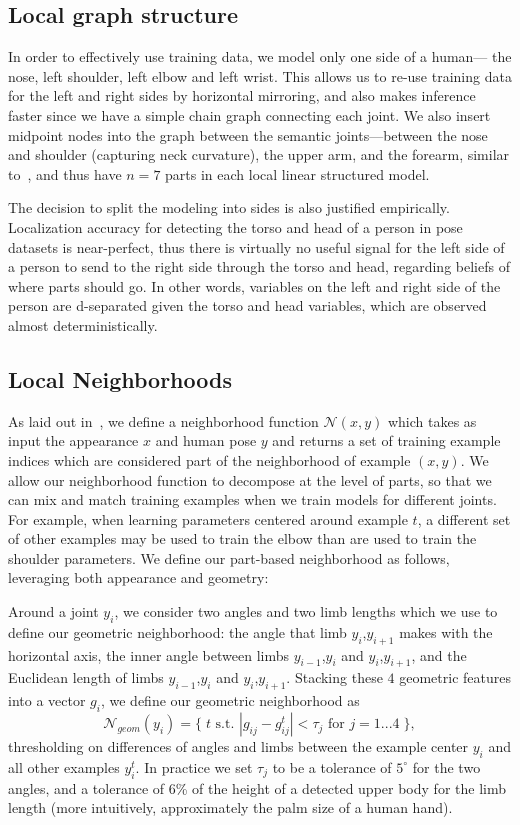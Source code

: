 \subsection{Local graph structure}
In order to effectively use training data, we model only one side of a human--- 
the nose, left shoulder, left elbow and left wrist. This allows us to re-use 
training data for the left and right sides by horizontal mirroring, and also 
makes inference faster since we have a simple chain graph connecting each 
joint.  We also insert midpoint nodes into the graph between the semantic 
joints---between the nose and shoulder  (capturing neck curvature), the upper 
arm, and the forearm, similar to~\citet{deva2011}, and thus have $n=7$ parts in 
each local linear structured model.

The decision to split the modeling into sides is also justified empirically.  
Localization accuracy for detecting the torso and head of a person in pose
datasets is near-perfect, thus there is virtually no useful signal for the left 
side of a person to send to the right side through the torso and head, 
regarding beliefs of where parts should go.  In other words, variables on the 
left and right side of the person are d-separated given the torso and head 
variables, which are observed almost deterministically.

\subsection{Local Neighborhoods}\label{sec:nbhd}

As laid out in~, we define a neighborhood function 
$\mathcal{N}(x,y)$ which takes as input the appearance $x$ and human pose $y$ 
and returns a set of training example indices which are considered part of the 
neighborhood of example $(x,y)$.  We allow our neighborhood function to 
decompose at the level of parts, so that we can mix and match training examples 
when we train models for different joints.  For example, when learning 
parameters centered around example $t$, a different set of other examples may 
be used to train the elbow than are used to train the shoulder parameters.  We 
define our part-based neighborhood as follows, leveraging both appearance and 
geometry:

 Around a joint $y_i$, 
we consider two angles and two limb lengths which we use to define our 
geometric neighborhood: the angle that limb $y_i$,$y_{i+1}$ makes with the 
horizontal axis, the inner angle between limbs $y_{i-1}$,$y_i$ and 
$y_{i}$,$y_{i+1}$, and the Euclidean length of limbs $y_{i-1}$,$y_i$ and 
$y_{i}$,$y_{i+1}$.  Stacking these $4$ geometric features into a vector $g_i$, 
we define our geometric neighborhood as $$ \mathcal{N}_{geom}(y_i) = \{\; t 
\text{ s.t. } |g_{ij} - g^t_{ij}| < \tau_j \text{ for $j=1...4$}\;\},$$ 
thresholding on differences of angles and limbs between the example center 
$y_i$ and all other examples $y_i^t$.  In practice we set $\tau_j$ to be a 
tolerance of $5^\circ$ for the two angles, and a tolerance of 6\% of the height 
of a detected upper body for the limb length (more intuitively, approximately 
the palm size of a human hand).


